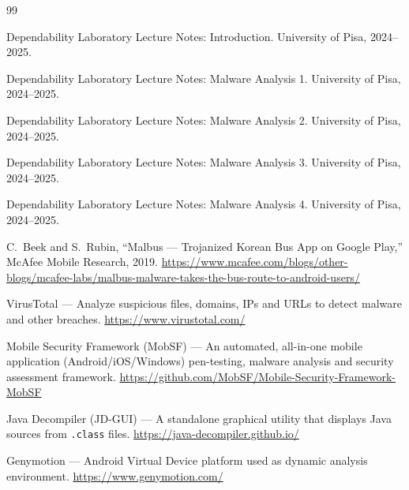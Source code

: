 \begin{thebibliography}{99}

     Dependability Laboratory Lecture Notes: Introduction.
    University of Pisa, 2024--2025.

     Dependability Laboratory Lecture Notes: Malware Analysis 1.
    University of Pisa, 2024--2025.

     Dependability Laboratory Lecture Notes: Malware Analysis 2.
    University of Pisa, 2024--2025.

     Dependability Laboratory Lecture Notes: Malware Analysis 3.
    University of Pisa, 2024--2025.

     Dependability Laboratory Lecture Notes: Malware Analysis 4.
    University of Pisa, 2024--2025.

     C.\ Beek and S.\ Rubin,
    ``Malbus --- Trojanized Korean Bus App on Google Play,''
    McAfee Mobile Research, 2019.
    \url{https://www.mcafee.com/blogs/other-blogs/mcafee-labs/malbus-malware-takes-the-bus-route-to-android-users/}

     VirusTotal --- Analyze suspicious files, domains, IPs
    and URLs to detect malware and other breaches.
    \url{https://www.virustotal.com/}

     Mobile Security Framework (MobSF) --- An automated,
    all-in-one mobile application (Android/iOS/Windows) pen-testing, malware
    analysis and security assessment framework.
    \url{https://github.com/MobSF/Mobile-Security-Framework-MobSF}

     Java Decompiler (JD-GUI) --- A standalone graphical utility
    that displays Java sources from \texttt{.class} files.
    \url{https://java-decompiler.github.io/}

     Genymotion --- Android Virtual Device platform used as
    dynamic analysis environment.
    \url{https://www.genymotion.com/}

\end{thebibliography}

\listoffigures